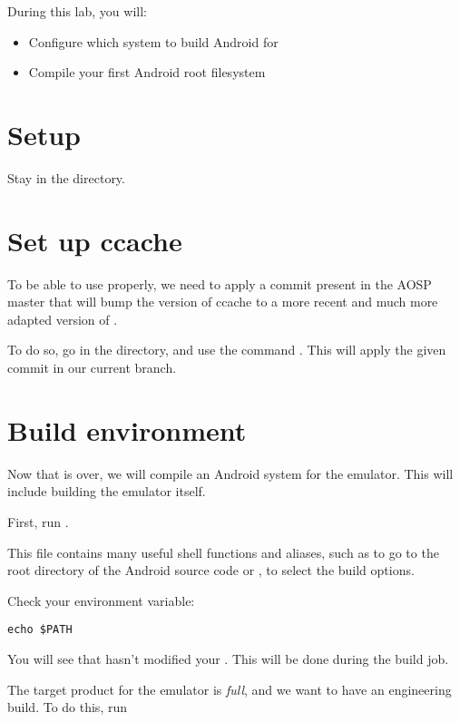 
During this lab, you will:
\begin{itemize}
  \item Configure which system to build Android for
  \item Compile your first Android root filesystem
\end{itemize}

\section{Setup}

Stay in the  directory.

\section{Set up ccache}

To be able to use  properly, we need to apply a commit
present in the AOSP master that will bump the version of ccache to a
more recent and much more adapted version of .

To do so, go in the  directory, and use the
command . This will apply the given
commit in our current branch.

\section{Build environment}

Now that  is over, we will compile an Android system
for the emulator. This will include building the emulator itself.

First, run .

This file contains many useful shell functions and aliases, such as
 to go to the root directory of the Android source code or
, to select the build options.

Check your  environment variable:

\begin{verbatim}
echo $PATH
\end{verbatim}

You will see that  hasn't modified your
.  This will be done during the build job.

The target product for the emulator is {\it full}, and we want to
have an engineering build. To do this, run 

